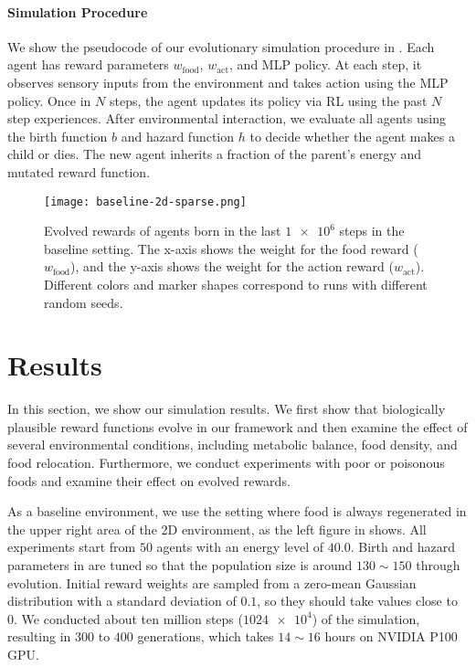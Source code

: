 \paragraph{Simulation Procedure}
We show the pseudocode of our evolutionary simulation procedure in . Each agent has reward parameters $w_{\mathrm{food}}$, $w_{\mathrm{act}}$, and MLP policy. At each step, it observes sensory inputs from the environment and takes action using the MLP policy. Once in $N$ steps, the agent updates its policy via RL using the past $N$ step experiences. After environmental interaction, we evaluate all agents using the birth function $b$ and hazard function $h$ to decide whether the agent makes a child or dies. The new agent inherits a fraction of the parent's energy and mutated reward function.

\begin{figure}[t]
  \centering
  \texttt{[image: baseline-2d-sparse.png]}
  \caption{
    Evolved rewards of agents born in the last $\num{1e6}$ steps in the baseline setting.
    The x-axis shows the weight for the food reward ($w_{\mathrm{food}}$), and the y-axis shows the weight for the action reward ($w_{\mathrm{act}}$).
    Different colors and marker shapes correspond to runs with different random seeds.
  }\label{figure:result-baseline}
\end{figure}

\section{Results}
In this section, we show our simulation results. We first show that biologically plausible reward functions evolve in our framework and then examine the effect of several environmental conditions, including metabolic balance, food density, and food relocation. Furthermore, we conduct experiments with poor or poisonous foods and examine their effect on evolved rewards.

As a baseline environment, we use the setting where food is always regenerated in the upper right area of the 2D environment, as the left figure in  shows. All experiments start from $50$ agents with an energy level of $40.0$. Birth and hazard parameters in  are tuned so that the population size is around $130\sim 150$ through evolution. Initial reward weights are sampled from a zero-mean Gaussian distribution with a standard deviation of $0.1$, so they should take values close to $0$. We conducted about ten million steps ($\num{1024e4}$) of the simulation, resulting in $300$ to $400$ generations, which takes $14\sim16$ hours on NVIDIA P100 GPU.

